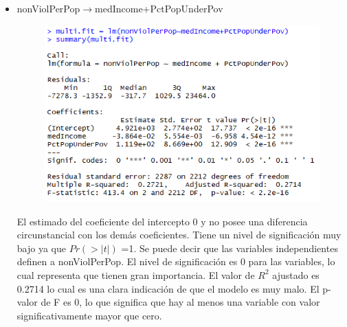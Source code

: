 \documentclass[a4paper,10pt,twocolumn]{article}
\begin{document}
\begin{itemize}
	\item {nonViolPerPop$\rightarrow$medIncome+PctPopUnderPov}







		\begin{figure}[H]
			\begin{center}
				\includegraphics[width=.92\columnwidth,right]{figures/multifit6.png}
			\end{center}
		\end{figure}

	El estimado del coeficiente del intercepto 0 y no posee una diferencia circunstancial con los demás coeficientes. Tiene un nivel de significación muy bajo ya que $Pr(> | t | )$ =1.
	Se puede decir que las variables independientes definen a nonViolPerPop. El nivel de significación es 0 para las variables, lo cual representa que tienen gran importancia. El valor de $R^2$ ajustado es 0.2714 lo cual es una clara indicación de que el modelo es muy malo. El p-valor de F es 0, lo que significa que hay al menos una variable con valor significativamente mayor que cero.


\end{itemize}
\end{document}
